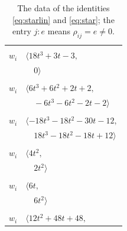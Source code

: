 \documentclass[11pt]{article}
\begin{document}
\begingroup\scriptsize
\setlength{\LTcapwidth}{\textwidth}
\begin{longtable}{@{}ll@{}}
\caption{The data of the identities \eqref{eq:starlin} and \eqref{eq:star}; the entry $j{:}e$ means $\rho_{ij}=e\neq0$.}\label{tab:star}\\
\hline\endfirsthead\hline\endhead\hline\endfoot
\multicolumn{2}{@{}p{0.97\textwidth}@{}}{$i=0$, $D_i=3$, $\rho_{ij}$: $8{:}2, \allowbreak 10{:}2, \allowbreak 13{:}2, \allowbreak 20{:}2, \allowbreak 25{:}1, \allowbreak 32{:}1$}\\
$w_i$ & $\langle 18t^{3}+3t-3,$\\
 & $\quad 0\rangle$\\
\addlinespace[2pt]
\multicolumn{2}{@{}p{0.97\textwidth}@{}}{$i=1$, $D_i=2$, $\rho_{ij}$: $7{:}2, \allowbreak 12{:}2, \allowbreak 13{:}1, \allowbreak 17{:}2, \allowbreak 18{:}1, \allowbreak 22{:}2, \allowbreak 23{:}1, \allowbreak 41{:}1$}\\
$w_i$ & $\langle 6t^{3}+6t^{2}+2t+2,$\\
 & $\quad -6t^{3}-6t^{2}-2t-2\rangle$\\
\addlinespace[2pt]
\multicolumn{2}{@{}p{0.97\textwidth}@{}}{$i=2$, $D_i=6$, $\rho_{ij}$: $6{:}2, \allowbreak 11{:}2, \allowbreak 12{:}2, \allowbreak 17{:}1, \allowbreak 24{:}2, \allowbreak 27{:}2, \allowbreak 35{:}1$}\\
$w_i$ & $\langle -18t^{3}-18t^{2}-30t-12,$\\
 & $\quad 18t^{3}-18t^{2}-18t+12\rangle$\\
\addlinespace[2pt]
\multicolumn{2}{@{}p{0.97\textwidth}@{}}{$i=3$, $D_i=1$, $\rho_{ij}$: $7{:}1, \allowbreak 32{:}2$}\\
$w_i$ & $\langle 4t^{2},$\\
 & $\quad 2t^{2}\rangle$\\
\addlinespace[2pt]
\multicolumn{2}{@{}p{0.97\textwidth}@{}}{$i=4$, $D_i=6$, $\rho_{ij}$: $18{:}1, \allowbreak 20{:}1, \allowbreak 26{:}1, \allowbreak 28{:}2, \allowbreak 30{:}1, \allowbreak 36{:}2$}\\
$w_i$ & $\langle 6t,$\\
 & $\quad 6t^{2}\rangle$\\
\addlinespace[2pt]
\multicolumn{2}{@{}p{0.97\textwidth}@{}}{$i=5$, $D_i=6$, $\rho_{ij}$: $22{:}2, \allowbreak 23{:}1, \allowbreak 24{:}1, \allowbreak 31{:}2, \allowbreak 37{:}1, \allowbreak 40{:}1, \allowbreak 42{:}1, \allowbreak 43{:}1$}\\
$w_i$ & $\langle 12t^{2}+48t+48,$\\

\end{longtable}
\end{document}
